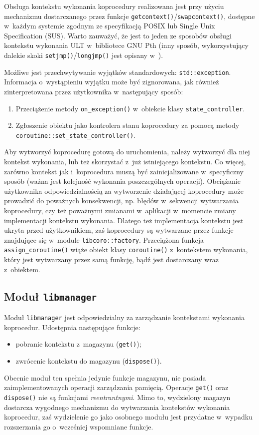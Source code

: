 \documentclass[12pt]{mwart}
\newcommand{\code}{\texttt}
\newcommand{\dcolon}{::}
\newcommand{\procbr}{()}
\begin{document}
\par
%
\indent
	Obsługa kontekstu wykonania koprocedury realizowana jest przy użyciu mechanizmu dostarczanego przez funkcje
	\code{getcontext()}/\code{swapcontext()}, dostępne w~każdym systemie zgodnym ze specyfikacją POSIX lub Single Unix Specification (SUS).
	Warto zauważyć, że jest to jeden ze sposobów obsługi kontekstu wykonania
	ULT w~bibliotece GNU Pth (inny sposób, wykorzystujący dalekie skoki \code{setjmp\procbr}/\code{longjmp\procbr} jest opisany w~\cite{Engelschall}).
\par
%
\indent
	Możliwe jest przechwytywanie wyjątków standardowych: \code{std\dcolon exception}. Informacja o~wystąpieniu wyjątku może być zignorowana,
	jak również zinterpretowana przez użytkownika w~następujący sposób:
	\begin{enumerate}
		\item Przeciążenie metody \code{on\_exception\procbr} w~obiekcie klasy \code{state\_controller}.
		\item Zgłoszenie obiektu jako kontrolera stanu koprocedury za pomocą metody \code{coroutine\dcolon set\_state\_controller\procbr}.
	\end{enumerate}
\par
%
\indent
	Aby wytworzyć koprocedurę gotową do uruchomienia, należy wytworzyć dla niej kontekst wykonania, lub też skorzystać z~już istniejącego
	kontekstu. Co więcej, zarówno kontekst jak i~koprocedura muszą być zainicjalizowane w~specyficzny sposób (ważna jest kolejność wykonania
	poszczególnych operacji). Obciążanie użytkownika odpowiedzialnością za wytworzenie działającej koprocedury może prowadzić do poważnych
	konsekwencji, np. błędów w~sekwencji wytwarzania koprocedury, czy też poważnymi zmianami w~aplikacji w~momencie zmiany implementacji
	kontekstu wykonania. Dlatego też implementacja kontekstu jest ukryta przed użytkownikiem, zaś koprocedury są wytwarzane przez funkcje znajdujące
	się w~module \code{libcoro\dcolon factory}. Przeciążona funkcja \code{assign\_coroutine\procbr} wiąże obiekt klasy \code{coroutine\procbr}
	z~kontekstem wykonania, który jest wytwarzany przez samą funkcję, bądź jest dostarczany wraz z~obiektem.
\par
%
\subsection{Moduł \code{libmanager}}
\indent
	Moduł \code{libmanager} jest odpowiedzialny za zarządzanie kontekstami wykonania koprocedur. Udostępnia następujące funkcje:
	\begin{itemize}
		\item pobranie kontekstu z~magazynu (\code{get\procbr});
		\item zwrócenie kontekstu do magazynu (\code{dispose\procbr}).
	\end{itemize}
	Obecnie moduł ten spełnia jedynie funkcje magazynu, nie posiada zaimplementowanych operacji zarządzania pamięcią.
	Operacje \code{get\procbr} oraz \code{dispose\procbr} nie są funkcjami \emph{reentrantnymi}.
	Mimo to, wydzielony magazyn dostarcza wygodnego mechanizmu do wytwarzania kontekstów wykonania koprocedur, zaś wydzielenie
	go jako osobnego modułu jest przydatne w~wypadku rozszerzania go o~wcześniej wspomniane funkcje.
\par
%
\end{document}
